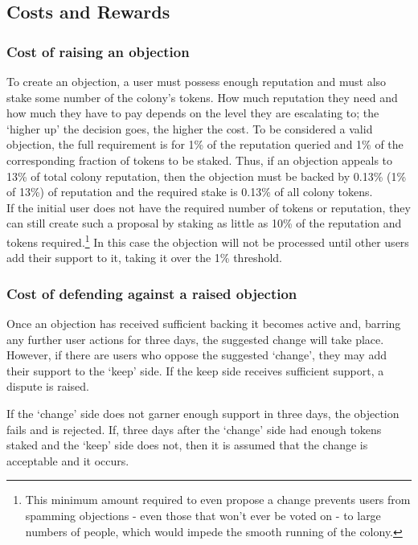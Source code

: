 \subsection{Costs and Rewards}\label{sec:costs-of-disputes}
\subsubsection{Cost of raising an objection}
To create an objection, a user must possess enough reputation and must also stake some number of the colony's tokens. How much reputation they need and how much they have to pay depends on the level they are escalating to; the `higher up' the decision goes, the higher the cost. To be considered a valid objection, the full requirement is for 1\% of the reputation queried and 1\% of the corresponding fraction of tokens to be staked. Thus, if an objection appeals to 13\% of total colony reputation, then the objection must be backed by 0.13\% (1\% of 13\%) of reputation and the required stake is 0.13\% of all colony tokens.\\
If the initial user does not have the required number of tokens or reputation, they can still create such a proposal by staking as little as 10\% of the reputation and tokens required.\footnote{This minimum amount required to even propose a change prevents users from spamming objections - even those that won’t ever be voted on - to large numbers of people, which would impede the smooth running of the colony.} In this case the objection will not be processed until other users add their support to it, taking it over the 1\% threshold. 

\subsubsection{Cost of defending against a raised objection}
Once an objection has received sufficient backing it becomes active and, barring any further user actions for three days, the suggested change will take place. 
However, if there are users who oppose the suggested `change', they may add their support to the `keep' side. If the keep side receives sufficient support, a dispute is raised. 

If the `change' side does not garner enough support in three days, the objection fails and is rejected.
If, three days after the `change' side had enough tokens staked and the `keep' side does not, then it is assumed that the change is acceptable and it occurs. 


